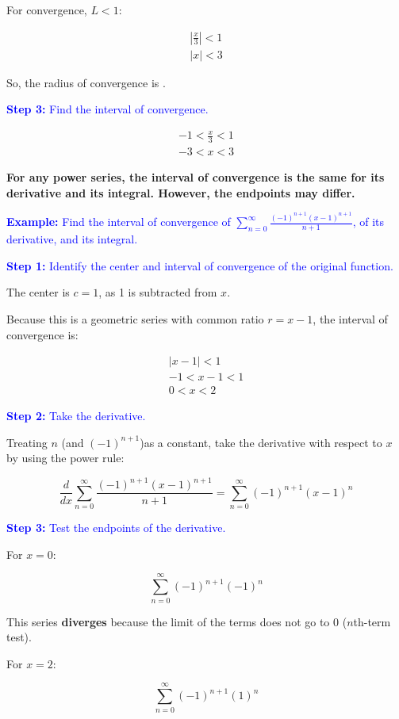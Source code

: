 \documentclass[letterpaper, 12pt]{article}
\newcommand{\example}[1]{\textcolor{blue}{\textbf{Example:} #1}}
\newcommand{\step}[2]{\textcolor{blue}{\textbf{Step #1:} #2}}
\begin{document}
For convergence, $L < 1$:

\begin{gather*}
\left| \frac{x}{3} \right| < 1 \\
|x| < 3
\end{gather*}

So, the radius of convergence is .

\step{3}{Find the interval of convergence.}

\begin{gather*}
-1 < \frac{x}{3} < 1 \\
\boxed{-3 < x < 3}
\end{gather*}

\textbf{For any power series, the interval of convergence is the same for its derivative and its integral. However, the endpoints may differ.}

\example{Find the interval of convergence of $\displaystyle \sum_{n=0}^\infty \frac{(-1)^{n+1}(x-1)^{n+1}}{n+1}$, of its derivative, and its integral.}

\step{1}{Identify the center and interval of convergence of the original function.}

The center is $c = 1$, as 1 is subtracted from $x$.

Because this is a geometric series with common ratio $r = x-1$, the interval of convergence is:

\begin{gather*}
|x-1| < 1 \\
-1 < x-1 < 1 \\
\boxed{0 < x < 2}
\end{gather*}

\step{2}{Take the derivative.}

Treating $n$ (and $(-1)^{n+1}$)as a constant, take the derivative with respect to $x$ by using the power rule:

$$ \frac{d}{dx} \displaystyle \sum_{n=0}^\infty \frac{(-1)^{n+1}(x-1)^{n+1}}{n+1} = \displaystyle \sum_{n=0}^\infty (-1)^{n+1}(x-1)^n$$

\step{3}{Test the endpoints of the derivative.}

For $x=0$:

$$\displaystyle \sum_{n=0}^\infty (-1)^{n+1}(-1)^n$$

This series \textbf{diverges} because the limit of the terms does not go to 0 ($n$th-term test).

For $x=2$:

$$\displaystyle \sum_{n=0}^\infty (-1)^{n+1}(1)^n$$
\end{document}
